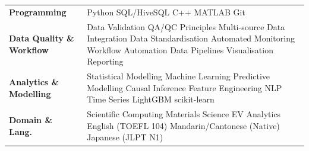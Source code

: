 \documentclass[a4paper,10pt]{article}
\begin{document}
\begin{tabular}{@{}p{3.0cm}p{12.5cm}@{}}
\textbf{Programming} & Python \textperiodcentered{} SQL/HiveSQL \textperiodcentered{} C++ \textperiodcentered{} MATLAB \textperiodcentered{} Git \\[1pt]
\textbf{Data Quality \& Workflow} & Data Validation \textperiodcentered{} QA/QC Principles \textperiodcentered{} Multi-source Data Integration \textperiodcentered{} Data Standardisation \textperiodcentered{} Automated Monitoring \textperiodcentered{} Workflow Automation \textperiodcentered{} Data Pipelines \textperiodcentered{} Visualisation \textperiodcentered{} Reporting \\[1pt]
\textbf{Analytics \& Modelling} & Statistical Modelling \textperiodcentered{} Machine Learning \textperiodcentered{} Predictive Modelling \textperiodcentered{} Causal Inference \textperiodcentered{} Feature Engineering \textperiodcentered{} NLP \textperiodcentered{} Time Series \textperiodcentered{} LightGBM \textperiodcentered{} scikit-learn \\[1pt]
\textbf{Domain \& Lang.} & Scientific Computing \textperiodcentered{} Materials Science \textperiodcentered{} EV Analytics \textperiodcentered{} English (TOEFL 104) \textperiodcentered{} Mandarin/Cantonese (Native) \textperiodcentered{} Japanese (JLPT N1) \\
\end{tabular}
\end{document}
